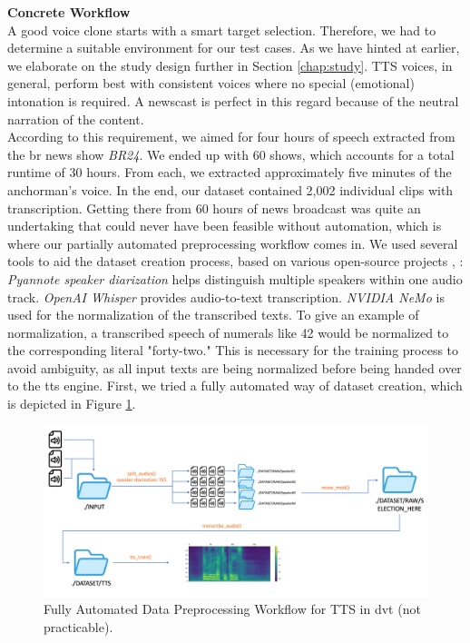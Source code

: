 \documentclass[
  a4paper,  %
  twoside,  %
  bibliography=totoc,
  headsepline,
  cleardoublepage=empty,
  parskip=half,
  draft=false
]{scrbook}
\begin{document}
\textbf{Concrete Workflow} \\
A good voice clone starts with a smart target selection. Therefore, we had to determine a suitable environment for our test cases. As we have hinted at earlier, we elaborate on the study design further in Section \ref{chap:study}. TTS voices, in general, perform best with consistent voices where no special (emotional) intonation is required. A newscast is perfect in this regard because of the neutral narration of the content. \\
According to this requirement, we aimed for four hours of speech extracted from the \gls{br} news show \textit{BR24}. We ended up with 60 shows, which accounts for a total runtime of 30 hours. From each, we extracted approximately five minutes of the anchorman's voice. In the end, our dataset contained 2,002 individual clips with transcription. Getting there from 60 hours of news broadcast was quite an undertaking that could never have been feasible without automation, which is where our partially automated preprocessing workflow comes in. We used several tools to aid the dataset creation process, based on various open-source projects \cite{micaAudioSplitterUsing2023}, \cite{harperEndtoEndToolkitVoice2023}: \textit{Pyannote speaker diarization} helps distinguish multiple speakers within one audio track. \textit{OpenAI Whisper} provides audio-to-text transcription. \textit{NVIDIA NeMo} is used for the normalization of the transcribed texts. To give an example of normalization, a transcribed speech of numerals like 42 would be normalized to the corresponding literal "forty-two." This is necessary for the training process to avoid ambiguity, as all input texts are being normalized before being handed over to the \gls{tts} engine. First, we tried a fully automated way of dataset creation, which is depicted in Figure \ref{fig:dvt-tts-original}.

\begin{figure}[h]
  \centering
  \includegraphics[width=1\textwidth]{./graphics/tts/tts dvt only.png}
  \caption{Fully Automated Data Preprocessing Workflow for TTS in \gls{dvt} (not practicable).}
  \label{fig:dvt-tts-original}
\end{figure}
\end{document}
